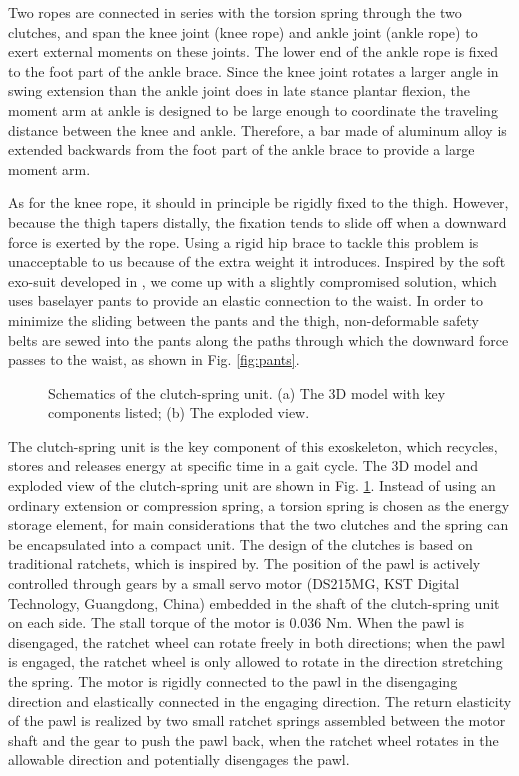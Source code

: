 \documentclass[10pt]{asme2ej}
\begin{document}
Two ropes are connected in series with the torsion spring through the two clutches, and span the knee joint (knee rope) and ankle joint (ankle rope) to exert external moments on these joints.
The lower end of the ankle rope is fixed to the foot part of the ankle brace.
Since the knee joint rotates a larger angle in swing extension than the ankle joint does in late stance plantar flexion, the moment arm at ankle is designed to be large enough to coordinate the traveling distance between the knee and ankle.
Therefore, a bar made of aluminum alloy is extended backwards from the foot part of the ankle brace to provide a large moment arm.

As for the knee rope, it should in principle be rigidly fixed to the thigh.
However, because the thigh tapers distally, the fixation tends to slide off when a downward force is exerted by the rope.
Using a rigid hip brace to tackle this problem is unacceptable to us because of the extra weight it introduces.
Inspired by the soft exo-suit developed in \cite{RN20}, we come up with a slightly compromised solution, which uses baselayer pants to provide an elastic connection to the waist.
In order to minimize the sliding between the pants and the thigh, non-deformable safety belts are sewed into the pants along the paths through which the downward force passes to the waist, as shown in Fig. \ref{fig:pants}.

\begin{figure}[t]
	\caption{Schematics of the clutch-spring unit. (a) The 3D model with key components listed; (b) The exploded view.}
	\label{fig:clutch}   
\end{figure}

The clutch-spring unit is the key component of this exoskeleton, which recycles, stores and releases energy at specific time in a gait cycle.
The 3D model and exploded view of the clutch-spring unit are shown in Fig. \ref{fig:clutch}.
Instead of using an ordinary extension or compression spring, a torsion spring is chosen as the energy storage element, for main considerations that the two clutches and the spring can be encapsulated into a compact unit.
The design of the clutches is based on traditional ratchets, which is inspired by\cite{RN19}.
The position of the pawl is actively controlled through gears by a small servo motor (DS215MG, KST Digital Technology, Guangdong, China) embedded in the shaft of the clutch-spring unit on each side.
The stall torque of the motor is 0.036 Nm.
When the pawl is disengaged, the ratchet wheel can rotate freely in both directions; when the pawl is engaged, the ratchet wheel is only allowed to rotate in the direction stretching the spring.
The motor is rigidly connected to the pawl in the disengaging direction and elastically connected in the engaging direction.
The return elasticity of the pawl is realized by two small ratchet springs assembled between the motor shaft and the gear to push the pawl back, when the ratchet wheel rotates in the allowable direction and potentially disengages the pawl.
\end{document}
